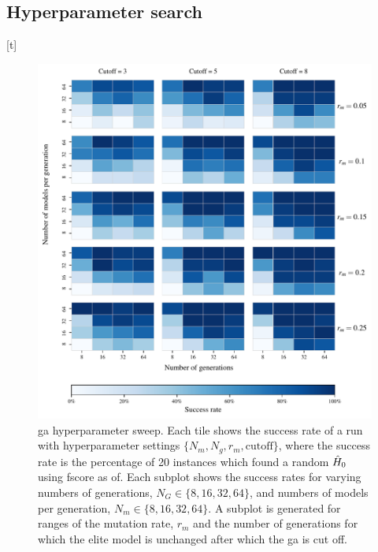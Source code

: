 \subsection{Hyperparameter search}
\label{sec:hyperparameter}[t]
\begin{figure}
    \begin{center}
        \includegraphics{theoretical_study/figures/gen_alg_param_sweep.pdf}
    \end{center}
    \caption[Genetic algorithm hyperparameter sweep]{
        \Acrlong{ga} hyperparameter sweep.
        Each tile shows the \gls{success rate} of a run with \gls{hyperparameter} settings $\{N_m, N_g, r_m, \textrm{cutoff}\}$, 
            where the \gls{success rate} is the percentage of 20 \glspl{instance} which found a random $\hat{H}_0$ using \gls{fscore} as \acrlong{of}.
        Each subplot shows the success rates for varying numbers of generations, $N_G \in \{8, 16, 32, 64\}$, 
        and numbers of models per generation, $N_m \in \{8, 16, 32, 64\}$. 
        A subplot is generated for ranges of the mutation rate, $r_m$ and the number of 
        generations for which the elite model is unchanged after which the \gls{ga} is cut off.
        \figtableref 
    }
    \label{fig:ga_param_sweep}
\end{figure}

